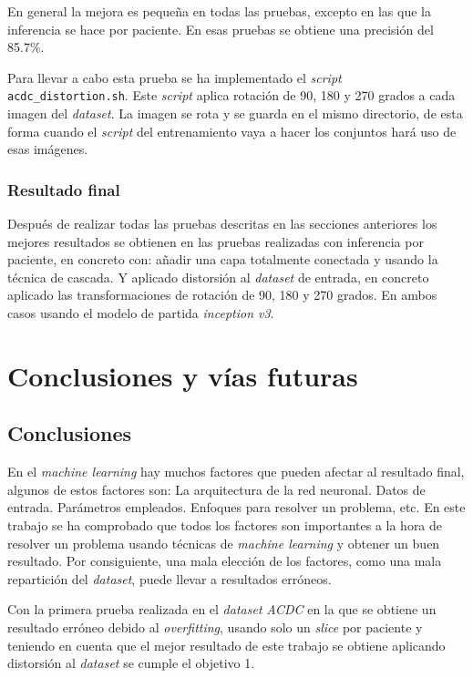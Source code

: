 \documentclass[12pt,a4paper]{article}
\begin{document}
En general la mejora es pequeña en todas las pruebas, excepto en las que la inferencia se hace por paciente. En esas pruebas se obtiene una precisión del 85.7\%.
\bigskip

Para llevar a cabo esta prueba se ha implementado el \textit{script} \texttt{acdc\_distortion.sh}. Este \textit{script} aplica rotación de 90, 180 y 270 grados a cada imagen del \textit{dataset}. La imagen se rota y se guarda en el mismo directorio, de esta forma cuando el \textit{script} del entrenamiento vaya a hacer los conjuntos hará uso de esas imágenes.

\subsubsection{Resultado final}
Después de realizar todas las pruebas descritas en las secciones anteriores los mejores resultados se obtienen en las pruebas realizadas con inferencia por paciente, en concreto con: añadir una capa totalmente conectada y usando la técnica de cascada. Y aplicado distorsión al \textit{dataset} de entrada, en concreto aplicado las transformaciones de rotación de 90, 180 y 270 grados. En ambos casos usando el modelo de partida \textit{inception v3}.

\newpage
\section{Conclusiones y vías futuras}
\subsection{Conclusiones}
En el \textit{machine learning} hay muchos factores que pueden afectar al resultado final, algunos de estos factores son: La arquitectura de la red neuronal. Datos de entrada. Parámetros empleados. Enfoques para resolver un problema, etc. En este trabajo se ha comprobado que todos los factores son importantes a la hora de resolver un problema usando técnicas de \textit{machine learning} y obtener un buen resultado. Por consiguiente, una mala elección de los factores, como una mala repartición del \textit{dataset}, puede llevar a resultados erróneos.
\bigskip

Con la primera prueba realizada en el \textit{dataset} \textit{ACDC} en la que se obtiene un resultado erróneo debido al \textit{overfitting}, usando solo un \textit{slice} por paciente y teniendo en cuenta que el mejor resultado de este trabajo se obtiene aplicando distorsión al \textit{dataset} se cumple el objetivo 1.
\bigskip
\end{document}
